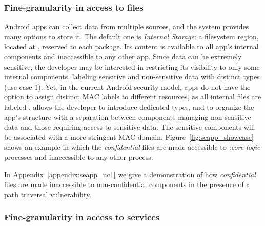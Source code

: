 \subsubsection{Fine-granularity in access to files}

Android apps can collect data from multiple sources, and the system
provides many options to store it.  The default one is {\em Internal
  Storage}: a filesystem region, located at \dataappdir, reserved to
each package.  Its content is available to all app's internal
components and inaccessible to any other app.  Since data can be
extremely sensitive, the developer may be interested in restricting
its visibility to only some internal components, labeling sensitive
and non-sensitive data with distinct \sel types (use case 1).  Yet, in
the current Android security model, apps do not have the option to
assign distinct MAC labels to different resources, as all internal
files are labeled \appdatafile.  \seapp allows the developer to
introduce dedicated types, and to organize the app's structure with a
separation between components managing non-sensitive data and those
requiring access to sensitive data.  The sensitive components will be
associated with a more stringent MAC domain.
Figure~\ref{fig:seapp_showcase} shows an example in which the {\em
  confidential} files are made accessible to {\em :core\textunderscore
  logic} processes and inaccessible to any other process.

In Appendix~\ref{appendix:seapp_uc1} we give a demonstration of how {\em
  confidential} files are made inaccessible to non-confidential
components in the presence of a path traversal vulnerability.


\subsubsection{Fine-granularity in access to services}

